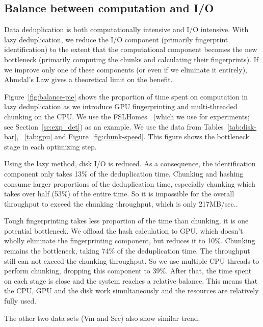 \documentclass[prodmode,acmtecs]{acmsmall}
\begin{document}
\subsection{Balance between computation and I/O}

Data deduplication is both computationally intensive and I/O intensive.  With lazy deduplication, we reduce the I/O component (primarily fingerprint identification) to the extent that the computational component becomes the new bottleneck (primarily computing the chunks and calculating their fingerprints).  If we improve only one of these components (or even if we eliminate it entirely), Ahmdal's Law gives a theoretical limit on the benefit.

Figure~\ref{fig:balance-pie} shows the proportion of time spent on computation in lazy deduplication as we introduce GPU fingerprinting and multi-threaded chunking on the CPU. We use the FSLHomes~\cite{tarasov2012generating} (which we use for experiments; see Section~\ref{se:exp_det}) as an example. We use the data from Tables~\ref{tab:disk-bar}, ~\ref{tab:gpu} and Figure~\ref{fig:chunk-speed}. This figure shows the bottleneck stage in each optimizing step.

Using the lazy method, disk I/O is reduced. As a consequence, the identification component only takes 13\% of the deduplication time. Chunking and hashing consume larger proportions of the deduplication time, especially chunking which takes over half (53\%) of the entire time. So it is impossible for the overall throughput to exceed the chunking throughput, which is only 217MB/sec..

Tough fingerprinting takes less proportion of the time than chunking, it is one potential bottleneck. We offload the hash calculation to GPU, which doesn't wholly eliminate the fingerprinting component, but reduces it to 10\%.  Chunking remains the bottleneck, taking 74\% of the deduplication time. The throughput still can not exceed the chunking throughput.
So we use multiple CPU threads to perform chunking, dropping this component to 39\%. After that, the time spent on each stage is close and the system reaches a relative balance. This means that the CPU, GPU and the disk work simultaneously and the resources are relatively fully used.

The other two data sets (Vm and Src) also show similar trend.
\end{document}
